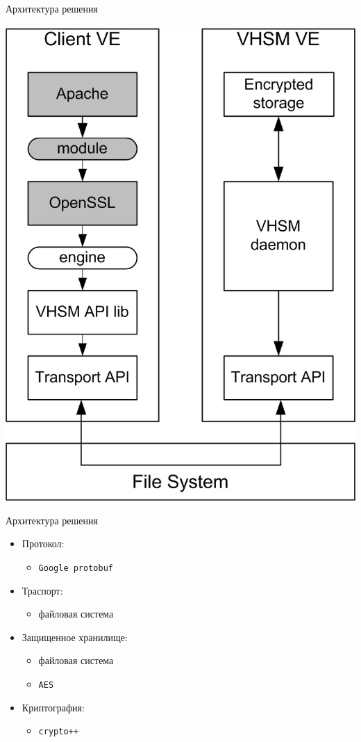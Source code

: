 \documentclass[utf8, 11pt]{beamer}
\begin{document}
\begin{frame}{Архитектура решения}
\begin{center}
\includegraphics[scale=0.7]{img3}
\end{center}
\end{frame}

\begin{frame}{Архитектура решения}
\begin{itemize}
\item Протокол:
	\begin{itemize}
	\item \texttt{Google protobuf}
	\end{itemize}
\item Траспорт:
	\begin{itemize}
	\item файловая система
	\end{itemize}
\item Защищенное хранилище:
	\begin{itemize}
	\item файловая система
	\item \texttt{AES}
	\end{itemize}
\item Криптография:
	\begin{itemize}
	\item \texttt{crypto++}
	\end{itemize}
\end{itemize}

\vspace*{\fill}
	
\end{frame}
\end{document}
